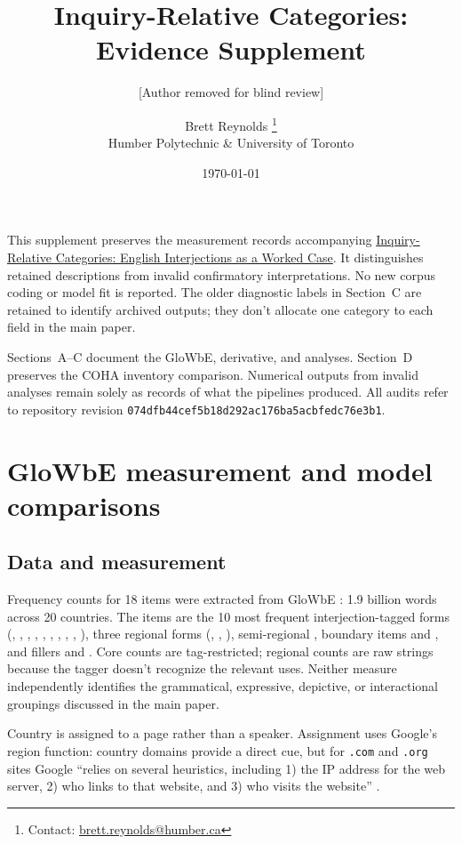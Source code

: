 \documentclass[12pt]{article}
\title{Inquiry-Relative Categories:\\Evidence Supplement}
\author{[Author removed for blind review]}
\author{Brett Reynolds \orcidlink{0000-0003-0073-7195}%
\thanks{Contact: \href{mailto:brett.reynolds@humber.ca}{brett.reynolds@humber.ca}}\\
Humber Polytechnic \& University of Toronto}
\date{\today}
\begin{document}
\maketitle


This supplement preserves the measurement records accompanying
\href{inquiry-relative-categories.pdf}{Inquiry-Relative Categories: English
Interjections as a Worked Case}. It distinguishes retained descriptions
from invalid confirmatory interpretations. No new corpus coding or model
fit is reported. The older diagnostic labels in Section~C are retained
to identify archived outputs; they don't allocate one category to each
field in the main paper.

\begingroup\raggedright
Sections~A--C document the GloWbE, derivative, and  analyses.
Section~D preserves the COHA inventory comparison. Numerical outputs from
invalid analyses remain solely as records of what the pipelines produced.
All audits refer to repository revision
\texttt{074dfb44cef5b18d292ac176ba5acbfedc76e3b1}.

\par\endgroup

\appendix

\section[GloWbE measurement and models]{GloWbE measurement and model comparisons}
\label{app:conditioning}

\subsection{Data and measurement}

Frequency counts for 18 items were extracted from GloWbE \citep{daviesfuchs2015}: 1.9 billion words across 20 countries. The items are the 10 most frequent interjection-tagged forms (, , , , , , , , , ), three regional forms (, , ), semi-regional , boundary items  and , and fillers  and . Core counts are tag-restricted; regional counts are raw strings because the tagger doesn't recognize the relevant uses. Neither measure independently identifies the grammatical, expressive, depictive, or interactional groupings discussed in the main paper.

Country is assigned to a page rather than a speaker. Assignment uses Google's region function: country domains provide a direct cue, but for \texttt{.com} and \texttt{.org} sites Google \enquote{relies on several heuristics, including 1) the IP address for the web server, 2) who links to that website, and 3) who visits the website} \citep[4]{daviesfuchs2015}. 
\end{document}
